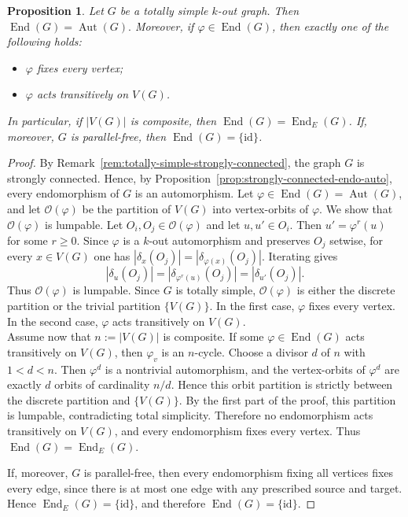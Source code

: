 \documentclass[a4paper,10pt]{amsart}
\theoremstyle{plain}
\newtheorem{proposition}[theorem]{Proposition}
\theoremstyle{definition}
\DeclareMathOperator{\Aut}{Aut}
\DeclareMathOperator{\End}{End}
\newcommand{\id}{\mathrm{id}}
\begin{document}
\begin{proposition}\label{prop:totally-simple-endomorphisms}
Let $G$ be a totally simple $k$-out graph. Then \(\End(G)=\Aut(G).\) Moreover, if $\varphi\in\End(G)$, then exactly one of the following holds:
\begin{itemize}
\item $\varphi$ fixes every vertex;
\item $\varphi$ acts transitively on $V(G)$.
\end{itemize}
In particular, if $|V(G)|$ is composite, then $\End(G)=\End_E(G)$.
If, moreover, $G$ is parallel-free, then $\End(G)=\{\id\}$.
\end{proposition}
\begin{proof}
By Remark~\ref{rem:totally-simple-strongly-connected}, the graph $G$ is strongly connected.
Hence, by Proposition~\ref{prop:strongly-connected-endo-auto}, every endomorphism of $G$ is an automorphism. Let $\varphi\in\End(G)=\Aut(G)$, and let $\mathcal O(\varphi)$ be the partition of $V(G)$ into
vertex-orbits of $\varphi$. We show that $\mathcal O(\varphi)$ is lumpable. Let $O_i,O_j\in
\mathcal O(\varphi)$ and let $u,u'\in O_i$. Then $u'=\varphi^r(u)$ for some $r\ge0$. Since
$\varphi$ is a $k$-out automorphism and preserves $O_j$ setwise, for every $x\in V(G)$ one has
$|\delta_x(O_j)|=|\delta_{\varphi(x)}(O_j)|$. Iterating gives
\[
|\delta_u(O_j)|=|\delta_{\varphi^r(u)}(O_j)|=|\delta_{u'}(O_j)|.
\]
Thus $\mathcal O(\varphi)$ is lumpable. Since $G$ is totally simple, $\mathcal O(\varphi)$ is either the discrete partition or the trivial
partition $\{V(G)\}$. In the first case, $\varphi$ fixes every vertex. In the second case,
$\varphi$ acts transitively on $V(G)$.
\\
Assume now that $n:=|V(G)|$ is composite. If some $\varphi\in\End(G)$ acts transitively on $V(G)$,
then $\varphi_v$ is an $n$-cycle. Choose a divisor $d$ of $n$ with $1<d<n$. Then $\varphi^d$ is a
nontrivial automorphism, and the vertex-orbits of $\varphi^d$ are exactly $d$ orbits of cardinality
$n/d$. Hence this orbit partition is strictly between the discrete partition and $\{V(G)\}$.
By the first part of the proof, this partition is lumpable, contradicting total simplicity.
Therefore no endomorphism acts transitively on $V(G)$, and every endomorphism fixes every vertex.
Thus $\End(G)=\End_E(G)$.

If, moreover, $G$ is parallel-free, then every endomorphism fixing all vertices fixes every edge,
since there is at most one edge with any prescribed source and target. Hence $\End_E(G)=\{\id\}$,
and therefore $\End(G)=\{\id\}$.
\end{proof}
\end{document}
